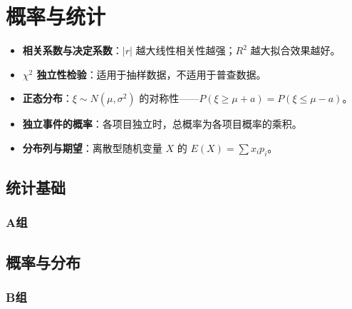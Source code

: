\chapter{概率与统计}

\begin{knowledgeframe}
\begin{itemize}
	\item \textbf{相关系数与决定系数}：$|r|$ 越大线性相关性越强；$R^2$ 越大拟合效果越好。
	\item \textbf{$\chi^2$ 独立性检验}：适用于抽样数据，不适用于普查数据。
	\item \textbf{正态分布}：$\xi \sim N(\mu, \sigma^2)$ 的对称性——$P(\xi \ge \mu+a)=P(\xi \le \mu-a)$。
	\item \textbf{独立事件的概率}：各项目独立时，总概率为各项目概率的乘积。
	\item \textbf{分布列与期望}：离散型随机变量 $X$ 的 $E(X)=\sum x_i p_i$。
\end{itemize}
\end{knowledgeframe}

\section{统计基础}

\startexercise

\subsection*{A组}



\stopexercise

\section{概率与分布}

\startexercise

\subsection*{B组}



\stopexercise
